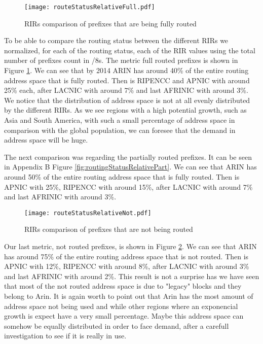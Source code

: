 \documentclass[11pt,a4paper]{scrreprt}
\begin{document}
\begin{figure}[!h]
\centering
\texttt{[image: routeStatusRelativeFull.pdf]}
\caption{RIRs comparison of prefixes that are being fully routed}
\label{fig:routingStatusRelativeFull}
\end{figure}

To be able to compare the routing status between the different RIRs we normalized, for each of the routing status, each of the RIR values using the total number of prefixes count in /8s. The metric full routed prefixes is shown in Figure \ref{fig:routingStatusRelativeFull}.  
We can see that by 2014 ARIN has around 40\% of the entire routing address space that is fully routed. Then is RIPENCC and APNIC with around 25\% each, after LACNIC with around 7\% and last AFRINIC  with around 3\%. We notice that the distribution of address space is not at all evenly distributed by the different RIRs. As we see regions with a high potential growth, such as Asia and South America, with such a small percentage of address space in comparison with the global population, we can foresee that the demand in address space will be huge.
  
The next comparison was regarding the partially routed prefixes. It can be seen in Appendix B Figure \ref{fig:routingStatusRelativePart}. We can see that ARIN has around 50\% of the entire routing address space that is fully routed. Then is APNIC with 25\%, RIPENCC with around 15\%, after LACNIC with around 7\% and last AFRINIC  with around 3\%. 



\begin{figure}[!h]
\centering
\texttt{[image: routeStatusRelativeNot.pdf]}
\caption{RIRs comparison of prefixes that are not being routed}
\label{fig:routingStatusRelativeNot}
\end{figure}

Our last metric, not routed prefixes, is shown in Figure \ref{fig:routingStatusRelativeNot}. We can see that ARIN has around 75\% of the entire routing address space that is not routed. Then is APNIC with 12\%, RIPENCC with around 8\%, after LACNIC with around 3\% and last AFRINIC  with around 2\%. This result is not a surprise has we have seen that most of the not routed address space is due to "legacy" blocks and they belong to Arin. It is again worth to point out that Arin has the most amount of address space not being used and while other regions where an exponencial growth is expect have a very small percentage. Maybe this address space can somehow be equally distributed in order to face demand, after a carefull investigation to see if it is really in use.
\end{document}
